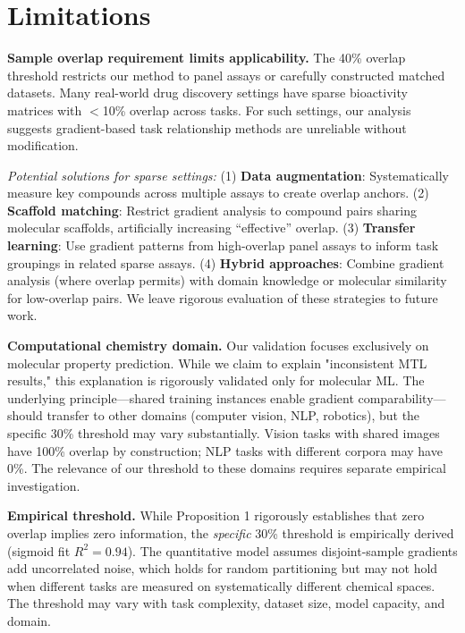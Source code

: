 \documentclass[sigconf,nonacm]{acmart}
\begin{document}
\section{Limitations}

\textbf{Sample overlap requirement limits applicability.} The 40\% overlap threshold restricts our method to panel assays or carefully constructed matched datasets. Many real-world drug discovery settings have sparse bioactivity matrices with $<$10\% overlap across tasks. For such settings, our analysis suggests gradient-based task relationship methods are unreliable without modification.

\textit{Potential solutions for sparse settings:} (1) \textbf{Data augmentation}: Systematically measure key compounds across multiple assays to create overlap anchors. (2) \textbf{Scaffold matching}: Restrict gradient analysis to compound pairs sharing molecular scaffolds, artificially increasing ``effective'' overlap. (3) \textbf{Transfer learning}: Use gradient patterns from high-overlap panel assays to inform task groupings in related sparse assays. (4) \textbf{Hybrid approaches}: Combine gradient analysis (where overlap permits) with domain knowledge or molecular similarity for low-overlap pairs. We leave rigorous evaluation of these strategies to future work.

\textbf{Computational chemistry domain.} Our validation focuses exclusively on molecular property prediction. While we claim to explain "inconsistent MTL results," this explanation is rigorously validated only for molecular ML. The underlying principle---shared training instances enable gradient comparability---should transfer to other domains (computer vision, NLP, robotics), but the specific 30\% threshold may vary substantially. Vision tasks with shared images have 100\% overlap by construction; NLP tasks with different corpora may have 0\%. The relevance of our threshold to these domains requires separate empirical investigation.

\textbf{Empirical threshold.} While Proposition 1 rigorously establishes that zero overlap implies zero information, the \textit{specific} 30\% threshold is empirically derived (sigmoid fit $R^2 = 0.94$). The quantitative model assumes disjoint-sample gradients add uncorrelated noise, which holds for random partitioning but may not hold when different tasks are measured on systematically different chemical spaces. The threshold may vary with task complexity, dataset size, model capacity, and domain.
\end{document}
